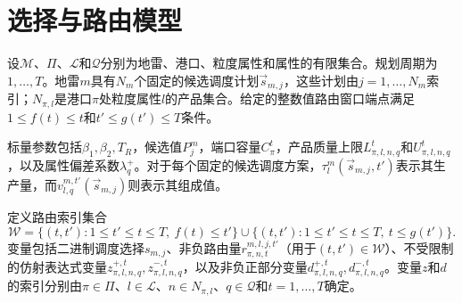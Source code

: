 \documentclass{article}
\begin{document}
\section*{选择与路由模型}

设$\mathcal M$、$\Pi$、$\mathcal L$和$\mathcal Q$分别为地雷、港口、粒度属性和属性的有限集合。规划周期为$1,\ldots,T$。地雷$m$具有$N_m$个固定的候选调度计划$\vec s_{m,j}$，这些计划由$j=1,\ldots,N_m$索引；$N_{\pi,l}$是港口$\pi$处粒度属性$l$的产品集合。给定的整数值路由窗口端点满足$1\leq f(t)\leq t$和$t'\leq g(t')\leq T$条件。

标量参数包括$\beta_1,\beta_2,T_R$，候选值$P_j^m$，端口容量$C_\pi^t$，产品质量上限$L_{\pi,l,n,q}^{t}$和$U_{\pi,l,n,q}^{t}$，以及属性偏差系数$\lambda_q^{+}$。对于每个固定的候选调度方案，$\tau_l^m(\vec s_{m,j},t')$表示其生产量，而$v_{l,q}^{m,t'}(\vec s_{m,j})$则表示其组成值。 

定义路由索引集合
\[
\mathcal W=\{(t,t'):1\leq t'\leq t\leq T,\ f(t)\leq t'\}
\cup\{(t,t'):1\leq t'\leq t\leq T,\ t\leq g(t')\}.
\]
变量包括二进制调度选择$s_{m,j}$、非负路由量$r_{\pi,n,t}^{m,l,j,t'}$（用于$(t,t')\in\mathcal W$）、不受限制的仿射表达式变量$z_{\pi,l,n,q}^{+,t},z_{\pi,l,n,q}^{-,t}$，以及非负正部分变量$d_{\pi,l,n,q}^{+,t},d_{\pi,l,n,q}^{-,t}$。变量$z$和$d$的索引分别由$\pi\in\Pi$、$l\in\mathcal L$、$n\in N_{\pi,l}$、$q\in\mathcal Q$和$t=1,\ldots,T$确定。
\end{document}
